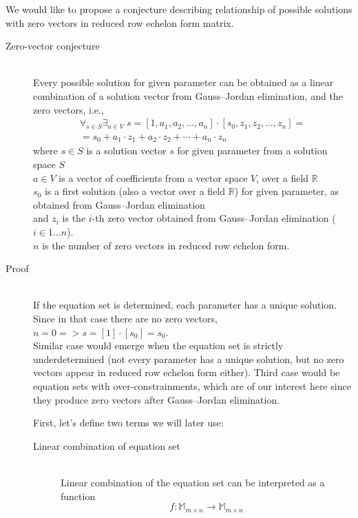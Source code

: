 We would like to propose a conjecture describing relationship of possible solutions with zero vectors in reduced row echelon form matrix.
\begin{description}
	\item[Zero-vector conjecture] \hfill \\
        Every possible solution for given parameter can be obtained as a linear combination of a solution vector from Gauss--Jordan elimination, and the zero vectors, i.e.,
    {\large
    \begin{equation}
    \begin{matrix}
        \forall_{s \in S} \displaystyle\exists_{a \in V} \; s = [1,a_1,a_2,\ldots,a_n]\cdot[s_0,z_1,z_2,\ldots,z_n]=\\=s_0 + a_1 \cdot z_1 + a_2 \cdot z_2 +\cdots+a_n \cdot z_n
    \end{matrix}
    \end{equation}
    }
    where $s \in S$ is a solution vector $s$ for given parameter from a solution space $S$ \\
    $a \in V$ is a vector of coefficients from a vector space $V$, over a field $\mathbb{R}$ \\
    $s_0$ is a first solution (also a vector over a field $\mathbb{R}$) for given parameter, as obtained from Gauss--Jordan elimination \\
    and $z_i$ is the $i$-th zero vector obtained from Gauss--Jordan elimination ($i \in 1\ldots n$). \\
    $n$ is the number of zero vectors in reduced row echelon form.
	\item[Proof] \hfill \\
    If the equation set is determined, each parameter has a unique solution. Since in that case there are no zero vectors, $n=0 => s = [1] \cdot [s_0] = s_0$.\\
    Similar case would emerge when the equation set is strictly underdetermined (not every parameter has a unique solution, but no zero vectors appear in reduced row echelon form either).
    Third case would be equation sets with over-constrainments, which are of our interest here since they produce zero vectors after Gauss--Jordan elimination.

    First, let's define two terms we will later use:

    \begin{description}
    	\item[Linear combination of equation set] \hfill \\
            Linear combination of the equation set can be interpreted as a function
            {\large
            \begin{equation}
                f: \mathbb{M}_{m \times n} \to \mathbb{M}_{m \times n}
            \end{equation}
            }


\end{description}
\end{description}
